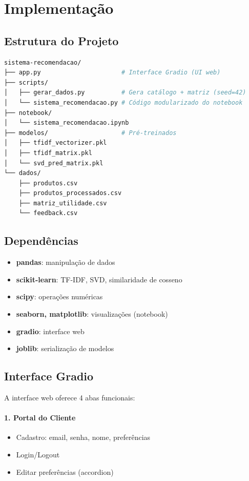 \documentclass[12pt,a4paper]{article}
\begin{document}
\section{Implementação}

\subsection{Estrutura do Projeto}

\begin{lstlisting}[language=bash]
sistema-recomendacao/
├── app.py                      # Interface Gradio (UI web)
├── scripts/
│   ├── gerar_dados.py          # Gera catálogo + matriz (seed=42)
│   └── sistema_recomendacao.py # Código modularizado do notebook
├── notebook/
│   └── sistema_recomendacao.ipynb
├── modelos/                    # Pré-treinados
│   ├── tfidf_vectorizer.pkl
│   ├── tfidf_matrix.pkl
│   └── svd_pred_matrix.pkl
└── dados/
    ├── produtos.csv
    ├── produtos_processados.csv
    ├── matriz_utilidade.csv
    └── feedback.csv
\end{lstlisting}

\subsection{Dependências}

\begin{itemize}
    \item \textbf{pandas}: manipulação de dados
    \item \textbf{scikit-learn}: TF-IDF, SVD, similaridade de cosseno
    \item \textbf{scipy}: operações numéricas
    \item \textbf{seaborn, matplotlib}: visualizações (notebook)
    \item \textbf{gradio}: interface web
    \item \textbf{joblib}: serialização de modelos
\end{itemize}

\subsection{Interface Gradio}

A interface web oferece 4 abas funcionais:

\paragraph{1. Portal do Cliente}
\begin{itemize}
    \item Cadastro: email, senha, nome, preferências
    \item Login/Logout
    \item Editar preferências (accordion)
\end{itemize}
\end{document}
